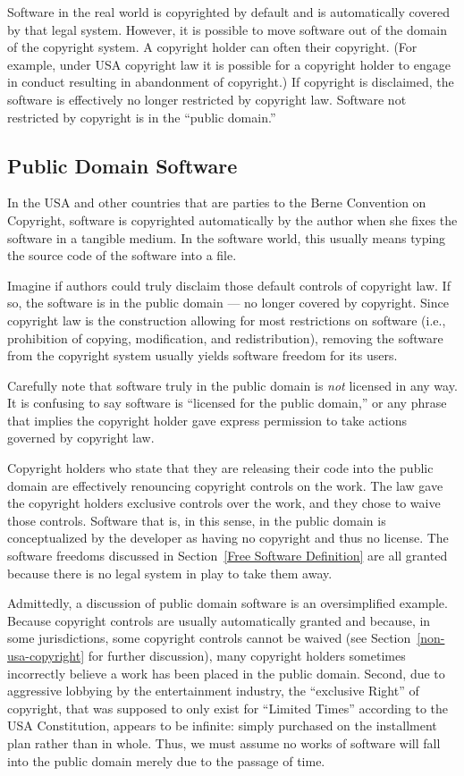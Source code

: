 Software in the real world is copyrighted by default and is automatically
covered by that legal system.  However, it is possible to move software out
of the domain of the copyright system.  A copyright holder can often
 their copyright. (For example, under USA copyright law
it is possible for a copyright holder to engage in conduct resulting
in abandonment of copyright.)  If copyright is disclaimed, the software is
effectively no longer restricted by copyright law.   Software not restricted by copyright is in the
``public domain.''

\subsection{Public Domain Software}

In the USA and other countries that
are parties to the Berne Convention on Copyright, software is copyrighted
automatically by the author when she fixes the software in a tangible
medium.  In the software world, this usually means typing the source code
of the software into a file.

Imagine if authors could truly disclaim those default controls of copyright
law.  If so, the software is in the public domain --- no longer covered by
copyright.  Since copyright law is the construction allowing for most
restrictions on software (i.e., prohibition of copying, modification, and
redistribution), removing the software from the copyright system usually
yields software freedom for its users.

Carefully note that software truly in the public domain is \emph{not} licensed
in any way.  It is confusing to say software is ``licensed for the
public domain,'' or any phrase that implies the copyright holder gave
express permission to take actions governed by copyright law.

Copyright holders who state that they are releasing their code into
the public domain are effectively renouncing copyright controls on
the work.  The law gave the copyright holders exclusive controls over the
work, and they chose to waive those controls.  Software that is, in
this sense, in the public domain
is conceptualized by the developer as having no copyright and thus no license. The software freedoms discussed in
Section~\ref{Free Software Definition} are all granted because there is no
legal system in play to take them away.

Admittedly, a discussion of public domain software is an oversimplified
example.  
Because copyright controls are usually automatically granted and because, in
some jurisdictions, some copyright controls cannot be waived (see
Section~\ref{non-usa-copyright} for further discussion), many copyright
holders sometimes incorrectly believe a work has been placed in the public
domain.  Second, due to aggressive lobbying by the entertainment industry,
the ``exclusive Right'' of copyright, that was supposed to only exist for
``Limited Times'' according to the USA Constitution, appears to be infinite:
simply purchased on the installment plan rather than in whole.  Thus, we must
assume no works of software will fall into the public domain merely due to
the passage of time.

